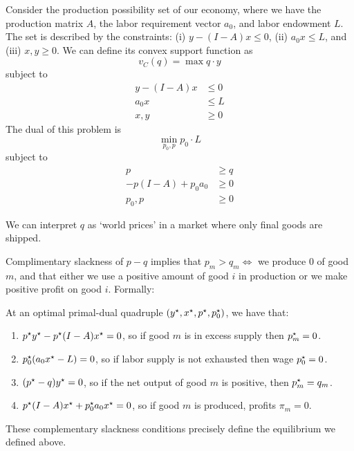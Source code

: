 \documentclass[10pt]{article}
\begin{document}
\begin{example}
	Consider the production possibility set of our economy, where we have the production matrix $A$, the labor requirement vector $a_0$, and labor endowment $L$. The set is described by the constraints: (i) $y - (I-A)x \le 0$, (ii) $a_0x \le L$, and (iii) $x,y \ge 0$. We can define its convex support function as \[v_C(q) = \max q \cdot y \]subject to\begin{align*} y - (I-A)x &\le 0 \\ a_0x &\le L\\ x,y &\ge 0\end{align*}The dual of this problem is \[\min_{p_0,p} p_0 \cdot L \]subject to \begin{align*} p &\ge q \\-p(I-A) + p_0a_0 &\ge 0 \\p_0,p &\ge 0\end{align*}
\end{example}
\begin{remark}
	We can interpret $q$ as `world prices' in a market where only final goods are shipped.
\end{remark}
\begin{remark}
	Complimentary slackness of $p - q$ implies that $p_m > q_m \Longleftrightarrow $ we produce $0$ of good $m$, and that either we use a positive amount of good $i$ in production or we make positive profit on good $i$. Formally:
\end{remark}
\begin{corollary}
	At an optimal primal-dual quadruple $(y^\star,x^\star,p^\star,p_0^\star)$, we have that:
	\begin{enumerate}
		\item $p^\star y^\star - p^\star (I-A)x^\star = 0$, so if good $m$ is in excess supply then $p^\star_m = 0$.
		\item $p_0^\star(a_0x^\star - L) = 0$, so if labor supply is not exhausted then wage $p_0^\star = 0$.
		\item $(p^\star - q)y^\star = 0$, so if the net output of good $m$ is positive, then $p_m^\star = q_m$.
		\item $p^\star(I-A)x^\star + p_0^\star a_0x^\star = 0$, so if good $m$ is produced, profits $\pi_m = 0$.
	\end{enumerate}
\end{corollary}
\begin{remark}
	These complementary slackness conditions precisely define the equilibrium we defined above.
\end{remark}
\end{document}
